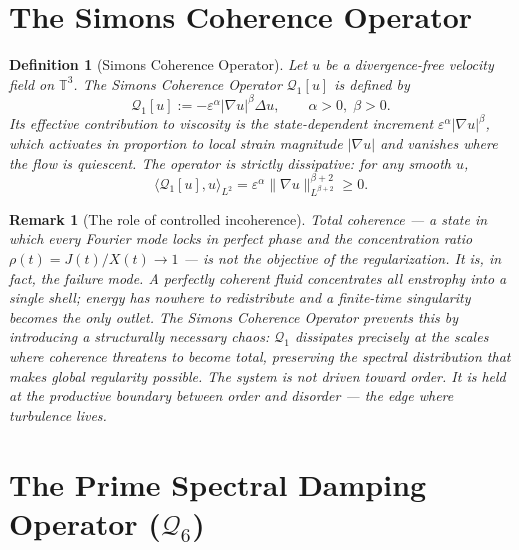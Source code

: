 \documentclass[11pt]{article}
\newtheorem{definition}[theorem]{Definition}
\newtheorem*{remark}{Remark}
\begin{document}
\section{The Simons Coherence Operator}

\begin{definition}[Simons Coherence Operator]\label{def:SCO}
Let $u$ be a divergence-free velocity field on $\mathbb{T}^3$.
The \emph{Simons Coherence Operator} $\mathcal{Q}_1[u]$ is defined by
\[
  \mathcal{Q}_1[u] := -\varepsilon^\alpha |\nabla u|^\beta \Delta u,
  \qquad \alpha > 0,\; \beta > 0.
\]
Its effective contribution to viscosity is the state-dependent increment
$\varepsilon^\alpha |\nabla u|^\beta$, which activates in proportion
to local strain magnitude $|\nabla u|$ and vanishes where the flow
is quiescent. The operator is strictly dissipative: for any smooth $u$,
\[
  \langle \mathcal{Q}_1[u], u \rangle_{L^2}
  = \varepsilon^\alpha \|\nabla u\|_{L^{\beta+2}}^{\beta+2} \geq 0.
\]
\end{definition}

\begin{remark}[The role of controlled incoherence]
Total coherence --- a state in which every Fourier mode locks in perfect
phase and the concentration ratio $\rho(t) = J(t)/X(t) \to 1$ ---
is not the objective of the regularization. It is, in fact, the
failure mode. A perfectly coherent fluid concentrates all enstrophy
into a single shell; energy has nowhere to redistribute and a
finite-time singularity becomes the only outlet. The Simons Coherence
Operator prevents this by introducing a \emph{structurally necessary}
chaos: $\mathcal{Q}_1$ dissipates precisely at the scales where
coherence threatens to become total, preserving the spectral
distribution that makes global regularity possible. The system is not
driven toward order. It is held at the productive boundary between
order and disorder --- the edge where turbulence lives.
\end{remark}


\section{The Prime Spectral Damping Operator ($\mathcal{Q}_6$)}
\end{document}
